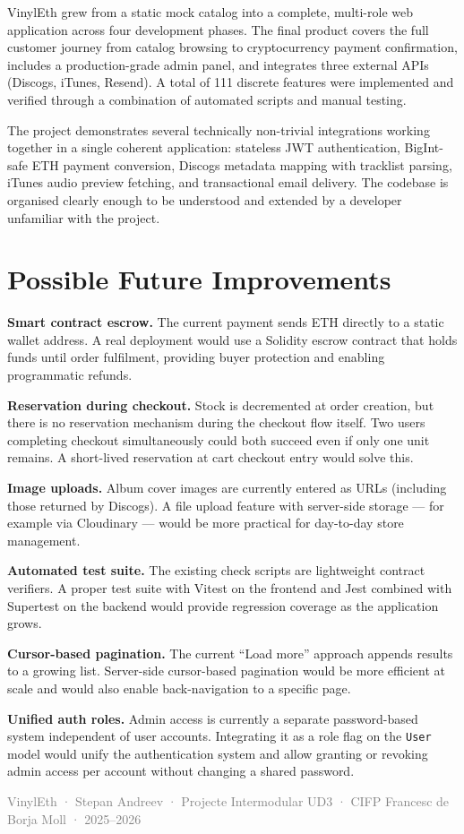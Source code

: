 \documentclass[11pt, a4paper]{report}
\begin{document}
VinylEth grew from a static mock catalog into a complete, multi-role web application across four development phases. The final product covers the full customer journey from catalog browsing to cryptocurrency payment confirmation, includes a production-grade admin panel, and integrates three external APIs (Discogs, iTunes, Resend). A total of 111 discrete features were implemented and verified through a combination of automated scripts and manual testing.

The project demonstrates several technically non-trivial integrations working together in a single coherent application: stateless JWT authentication, BigInt-safe ETH payment conversion, Discogs metadata mapping with tracklist parsing, iTunes audio preview fetching, and transactional email delivery. The codebase is organised clearly enough to be understood and extended by a developer unfamiliar with the project.

\section{Possible Future Improvements}

\textbf{Smart contract escrow.} The current payment sends ETH directly to a static wallet address. A real deployment would use a Solidity escrow contract that holds funds until order fulfilment, providing buyer protection and enabling programmatic refunds.

\textbf{Reservation during checkout.} Stock is decremented at order creation, but there is no reservation mechanism during the checkout flow itself. Two users completing checkout simultaneously could both succeed even if only one unit remains. A short-lived reservation at cart checkout entry would solve this.

\textbf{Image uploads.} Album cover images are currently entered as URLs (including those returned by Discogs). A file upload feature with server-side storage — for example via Cloudinary — would be more practical for day-to-day store management.

\textbf{Automated test suite.} The existing check scripts are lightweight contract verifiers. A proper test suite with Vitest on the frontend and Jest combined with Supertest on the backend would provide regression coverage as the application grows.

\textbf{Cursor-based pagination.} The current ``Load more'' approach appends results to a growing list. Server-side cursor-based pagination would be more efficient at scale and would also enable back-navigation to a specific page.

\textbf{Unified auth roles.} Admin access is currently a separate password-based system independent of user accounts. Integrating it as a role flag on the \texttt{User} model would unify the authentication system and allow granting or revoking admin access per account without changing a shared password.

\vfill

\begin{center}
  \textcolor{gray}{\small\sffamily
    VinylEth · Stepan Andreev · Projecte Intermodular UD3 ·
    CIFP Francesc de Borja Moll · 2025–2026
  }
\end{center}
\end{document}
